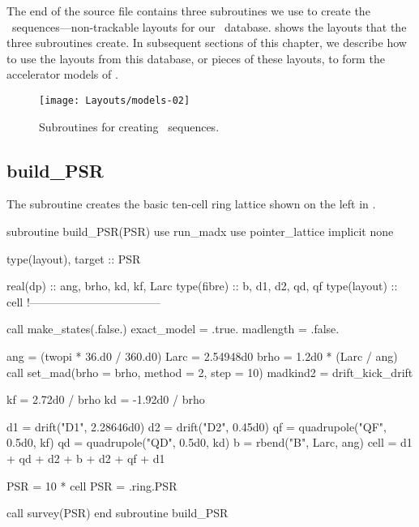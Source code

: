 %
The end of the  source file contains three
subroutines we use to create the \DNA\ sequences---non-trackable
layouts for our \DNA\ database.  shows the
layouts that the three subroutines create. In subsequent sections
of this chapter, we describe how to use the layouts from this database,
or pieces of these layouts, to form the accelerator models of
.

\begin{figure}[ht]
  \centering
  \texttt{[image: Layouts/models-02]}
  \caption{Subroutines for creating \DNA\ sequences.}
  \label{fig:DNA.subrtns}
\end{figure}


\subsection{build_PSR}
\label{sec:build.psr}

%
The subroutine  creates the basic ten-cell ring
lattice shown on the left in .

\begin{ptccode}
subroutine  build_PSR(PSR)
use run_madx
use pointer_lattice
implicit none

type(layout), target :: PSR

real(dp) :: ang, brho, kd, kf, Larc
type(fibre) :: b, d1, d2, qd, qf
type(layout) :: cell
!-----------------------------------

call make_states(.false.)       \label{lin:bptc.psrstates}
exact_model = .true.
madlength = .false.             \label{lin:eptc.psrstates}

ang = (twopi * 36.d0 / 360.d0)
Larc = 2.54948d0
brho = 1.2d0 * (Larc / ang)
call set_mad(brho = brho, method = 2, step = 10) \label{lin:psr.setmad}
madkind2 = drift_kick_drift

kf =  2.72d0 / brho
kd = -1.92d0 / brho

d1 = drift("D1", 2.28646d0)     \label{lin:bptc.psrlatt}
d2 = drift("D2", 0.45d0)
qf = quadrupole("QF", 0.5d0, kf)
qd = quadrupole("QD", 0.5d0, kd)
b  = rbend("B", Larc, ang) \label{lin:psr.bend}
cell = d1 + qd + d2 + b + d2 + qf + d1 \label{lin:eptc.psrlatt}

PSR = 10 * cell
PSR = .ring.PSR                 \label{lin:psr.ring}

call survey(PSR)                \label{lin:psr.survey}
end subroutine build_PSR
\end{ptccode}

